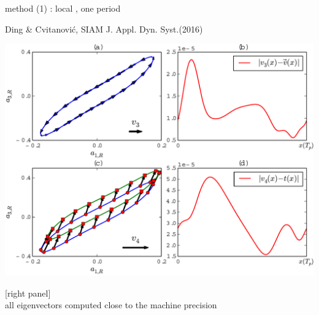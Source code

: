 \begin{frame}{method (1) : local \rpo, one period}
\begin{block}{Ding \& Cvitanovi{\'c}, SIAM J. Appl. Dyn. Syst.(2016)}
\begin{center}
\includegraphics[width=1.0\textwidth]{../../xiong/figures/ppo1vectfield}
\end{center}
\end{block}
[right panel] \\
all eigenvectors computed close to the machine precision
\end{frame}

